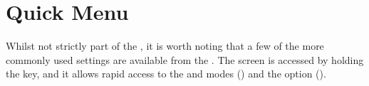 {
\section{Quick Menu}
  Whilst not strictly part of the , it is worth noting that a few
  of the more commonly used settings are available from the .
  The  screen is accessed by holding the 
   key, and it allows rapid access to the  and  modes 
  ()
  and the  option ().
}

